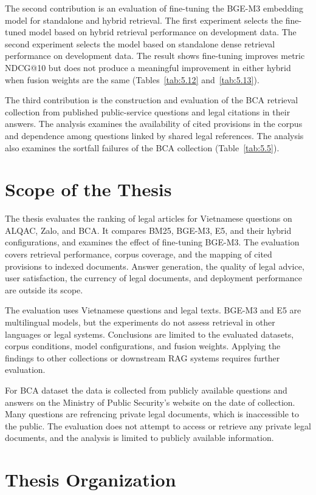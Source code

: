 The second contribution is an evaluation of fine-tuning the BGE-M3 embedding model for standalone and hybrid retrieval. The first experiment selects the fine-tuned model based on hybrid retrieval performance on development data. The second experiment selects the model based on standalone dense retrieval performance on development data. The result shows fine-tuning improves metric NDCG@10 but does not produce a meaningful improvement in either hybrid when fusion weights are the same (Tables~\ref{tab:5.12} and~\ref{tab:5.13}).

The third contribution is the construction and evaluation of the BCA retrieval collection from published public-service questions and legal citations in their answers. The analysis examines the availability of cited provisions in the corpus and dependence among questions linked by shared legal references. The analysis also examines the sortfall failures of the BCA collection (Table~\ref{tab:5.5}).

\section{Scope of the Thesis}

The thesis evaluates the ranking of legal articles for Vietnamese questions on ALQAC, Zalo, and BCA. It compares BM25, BGE-M3, E5, and their hybrid configurations, and examines the effect of fine-tuning BGE-M3. The evaluation covers retrieval performance, corpus coverage, and the mapping of cited provisions to indexed documents. Answer generation, the quality of legal advice, user satisfaction, the currency of legal documents, and deployment performance are outside its scope.

The evaluation uses Vietnamese questions and legal texts. BGE-M3 and E5 are multilingual models, but the experiments do not assess retrieval in other languages or legal systems. Conclusions are limited to the evaluated datasets, corpus conditions, model configurations, and fusion weights. Applying the findings to other collections or downstream RAG systems requires further evaluation.

For BCA dataset the data is collected from publicly available questions and answers on the Ministry of Public Security's website on the date of collection. Many questions are refrencing private legal documents, which is inaccessible to the public. The evaluation does not attempt to access or retrieve any private legal documents, and the analysis is limited to publicly available information.
\section{Thesis Organization}

